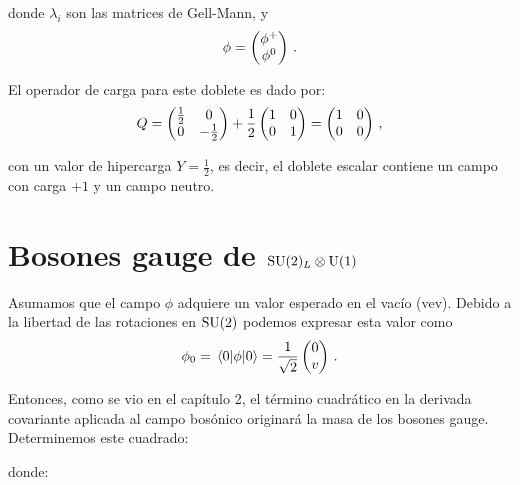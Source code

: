 \noindent donde $\lambda_i$ son las matrices de Gell-Mann, y 
%
\begin{equation}
	\phi = \pmqty{\phi^{+} \\ \phi^{0}}\,.
\end{equation}

El operador de carga para este doblete es dado por:
%
\begin{equation}
	Q = \pmqty{\tfrac{1}{2} & 0 \\ 0 & -\tfrac{1}{2}} + \frac{1}{2} \pmqty{1 & 0 \\ 0 & 1} = \pmqty{1 & 0 \\ 0 & 0} \,,
\end{equation}

\noindent con un valor de hipercarga $Y=\frac{1}{2}$, es decir, el doblete escalar contiene un campo con carga $+1$ y un campo neutro.




\section{Bosones gauge de $\mathrm{SU}(2)_L \otimes \mathrm{U}(1)$}

Asumamos que el campo $\phi$ adquiere un valor esperado en el vacío (vev). Debido a la libertad de las rotaciones en $\mathrm{SU}(2)$ podemos expresar esta valor como
%
\begin{equation}
	\phi_0 = \mel{0}{\phi}{0} = \frac{1}{\sqrt{2}} \pmqty{0 \\ v} \,.
\end{equation}

Entonces, como se vio en el capítulo 2, el término cuadrático en la derivada covariante aplicada al campo bosónico originará la masa de los bosones gauge. Determinemos este cuadrado:
%

\noindent donde:
%

